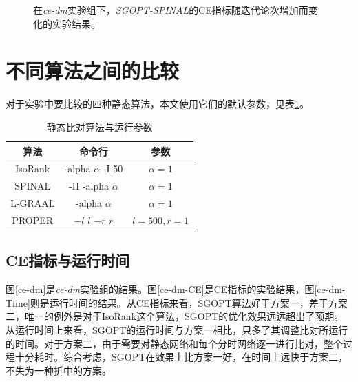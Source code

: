 \begin{figure}[htbp]
{\begin{minipage}[b]{0.5\linewidth}
            \label{alphad}
        \end{minipage}
    }
    \caption{在\textit{ce-dm}实验组下，\textit{SGOPT-SPINAL}的CE指标随迭代论次增加而变化的实验结果。}
    \label{alphaall}
\end{figure}


\section{不同算法之间的比较}

对于实验中要比较的四种静态算法，本文使用它们的默认参数，见表\ref{table:3}。

\begin{table}[htbp]
    \centering
    \caption{静态比对算法与运行参数}
    \label{table:3}
    \begin{tabular}{ccc}
         \hline 算法&命令行&参数\\
         \hline IsoRank&-alpha $\alpha$ -I 50&$\alpha=1$\\
         SPINAL&-II -alpha $\alpha$&$\alpha=1$\\
         L-GRAAL&-alpha $\alpha$&$\alpha=1$\\
         PROPER&$-l$ $l$ $-r$ $r$&$l=500,r=1$\\
         \hline
    \end{tabular}
\end{table}

\subsection{CE指标与运行时间}
图\ref{ce-dm}是\textit{ce-dm}实验组的结果。图\ref{ce-dm-CE}是CE指标的实验结果，图\ref{ce-dm-Time}则是运行时间的结果。从CE指标来看，SGOPT算法好于方案一，差于方案二，唯一的例外是对于IsoRank这个算法，SGOPT的优化效果远远超出了预期。从运行时间上来看，SGOPT的运行时间与方案一相比，只多了其调整比对所运行的时间。对于方案二，由于需要对静态网络和每个分时网络逐一进行比对，整个过程十分耗时。综合考虑，SGOPT在效果上比方案一好，在时间上远快于方案二，不失为一种折中的方案。

